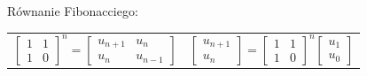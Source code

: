\documentclass[handout]{beamer}
\theoremstyle{definition}
\begin{document}
\begin{frame}{Równanie Fibonacciego:}
\begin{table}[]
\begin{tabular}{c|c}
\begin{equation*}
        \begin{bmatrix}
        1 & 1\\
        1 & 0
        \end{bmatrix}^n
        = 
        \begin{bmatrix}
        u_{n+1} & u_n\\
        u_{n} & u_{n-1}
        \end{bmatrix}

    \end{equation*}
&  
       \begin{equation*}
        \begin{bmatrix}
        u_{n+1} \\
        u_{n}
        \end{bmatrix}
        = 
        \begin{bmatrix}
        1 & 1\\
        1 & 0
        \end{bmatrix}^n
        \begin{bmatrix}
        u_1 \\
        u_0 
        \end{bmatrix}

    \end{equation*}

    \end{tabular}
\end{table}


\end{frame}
\end{document}
